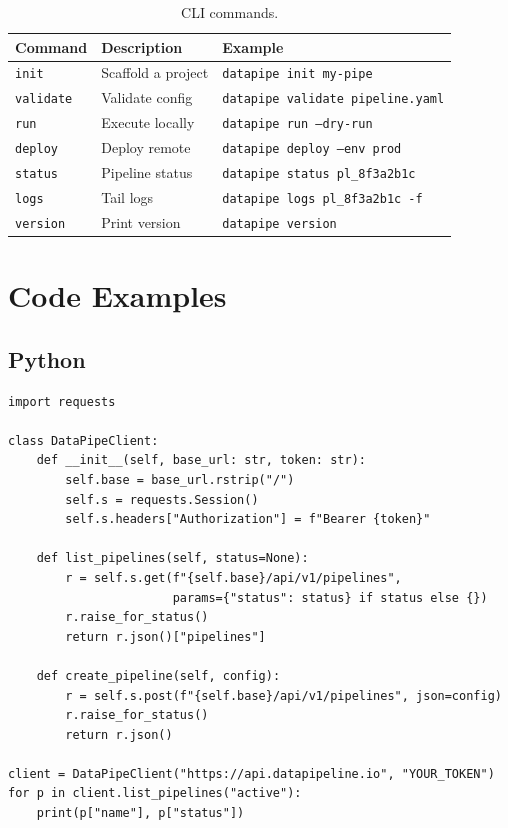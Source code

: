 \documentclass[
    language=english,
    doctype=article,
    institution=none,
]{../../omnilatex}
\begin{document}
\begin{table}[htbp]
    \centering
    \caption{CLI commands.}
    \label{tab:cli}
    \begin{tabular}{@{}lp{5cm}p{3.5cm}@{}}
        \toprule
        \textbf{Command} & \textbf{Description} & \textbf{Example} \\
        \midrule
        \texttt{init}     & Scaffold a project & \texttt{datapipe init my-pipe} \\
        \texttt{validate} & Validate config & \texttt{datapipe validate pipeline.yaml} \\
        \texttt{run}      & Execute locally & \texttt{datapipe run --dry-run} \\
        \texttt{deploy}   & Deploy remote & \texttt{datapipe deploy --env prod} \\
        \texttt{status}   & Pipeline status & \texttt{datapipe status pl\_8f3a2b1c} \\
        \texttt{logs}     & Tail logs & \texttt{datapipe logs pl\_8f3a2b1c -f} \\
        \texttt{version}  & Print version & \texttt{datapipe version} \\
        \bottomrule
    \end{tabular}
\end{table}

\section{Code Examples}
\label{sec:code-examples}

\subsection{Python}

\begin{verbatim}
import requests

class DataPipeClient:
    def __init__(self, base_url: str, token: str):
        self.base = base_url.rstrip("/")
        self.s = requests.Session()
        self.s.headers["Authorization"] = f"Bearer {token}"

    def list_pipelines(self, status=None):
        r = self.s.get(f"{self.base}/api/v1/pipelines",
                       params={"status": status} if status else {})
        r.raise_for_status()
        return r.json()["pipelines"]

    def create_pipeline(self, config):
        r = self.s.post(f"{self.base}/api/v1/pipelines", json=config)
        r.raise_for_status()
        return r.json()

client = DataPipeClient("https://api.datapipeline.io", "YOUR_TOKEN")
for p in client.list_pipelines("active"):
    print(p["name"], p["status"])
\end{verbatim}
\end{document}
